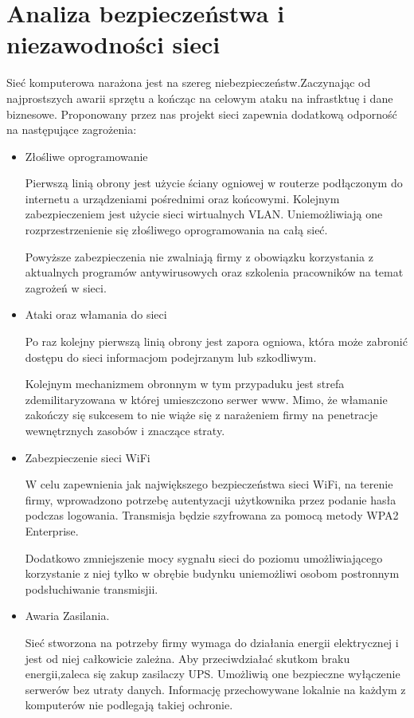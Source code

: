 \documentclass{report}
\begin{document}
\section{Analiza bezpieczeństwa i niezawodności sieci}
Sieć komputerowa narażona jest na szereg niebezpieczeństw.Zaczynając od 
najprostszych awarii sprzętu a kończąc na celowym ataku na infrastktuę i dane biznesowe.
Proponowany przez nas projekt sieci zapewnia dodatkową odporność na następujące zagrożenia:
\begin{itemize}


\item{Złośliwe oprogramowanie}

Pierwszą linią obrony jest użycie ściany ogniowej
w routerze podłączonym do internetu a urządzeniami pośrednimi oraz
końcowymi. Kolejnym  zabezpieczeniem
jest użycie sieci wirtualnych VLAN. Uniemożliwiają one rozprzestrzenienie się złośliwego oprogramowania na całą sieć.           

Powyższe zabezpieczenia nie zwalniają firmy z obowiązku korzystania z 
aktualnych programów antywirusowych oraz szkolenia pracowników na temat zagrożeń w sieci.

\item {Ataki oraz włamania do sieci}

Po raz kolejny pierwszą linią obrony jest zapora ogniowa,
która może zabronić dostępu do sieci informacjom podejrzanym lub
szkodliwym. 

Kolejnym mechanizmem obronnym w tym przypaduku jest strefa zdemilitaryzowana w której umieszczono serwer www.
Mimo, że  włamanie zakończy się sukcesem to nie wiąże się z
narażeniem firmy na penetracje wewnętrznych zasobów i znaczące straty.

\item {Zabezpieczenie sieci  WiFi}

W celu zapewnienia jak największego bezpieczeństwa sieci
WiFi, na terenie firmy, wprowadzono potrzebę autentyzacji
użytkownika przez podanie hasła podczas logowania. Transmisja będzie szyfrowana za pomocą metody WPA2 Enterprise.

Dodatkowo zmniejszenie mocy sygnału sieci do poziomu umożliwiającego korzystanie z niej tylko w obrębie budynku
uniemożliwi osobom postronnym podsłuchiwanie transmisjii.

\item Awaria Zasilania.

Sieć stworzona na potrzeby firmy wymaga do działania energii
elektrycznej i jest od niej całkowicie zależna. Aby przeciwdziałać skutkom braku energii,zaleca się zakup zasilaczy UPS.
Umożliwią one bezpieczne wyłączenie serwerów bez utraty danych. Informację przechowywane lokalnie na
każdym z komputerów nie podlegają takiej ochronie.


\end{itemize}
\end{document}
